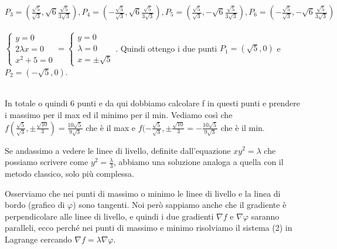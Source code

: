 \begin{itemize}
\begin{enumerate}
        $P_3 = (\frac{\sqrt{5}}{\sqrt{3}}, \sqrt{6}\frac{\sqrt{5}}{3\sqrt{3}}), P_4 = (-\frac{\sqrt{5}}{\sqrt{3}}, \sqrt{6}\frac{\sqrt{5}}{3\sqrt{3}}), P_5 = (\frac{\sqrt{5}}{\sqrt{3}}, -\sqrt{6}\frac{\sqrt{5}}{3\sqrt{3}}), P_6 = (-\frac{\sqrt{5}}{\sqrt{3}}, -\sqrt{6}\frac{\sqrt{5}}{3\sqrt{3}})$\\\\
        $\begin{cases}y = 0 \\ 2\lambda x = 0 \\ x^2 + 5 = 0\end{cases} = \begin{cases}y = 0 \\ \lambda = 0 \\ x = \pm \sqrt{5}\end{cases}$. Quindi ottengo i due punti $P_1 = (\sqrt{5},0)$ e $P_2 = (-\sqrt{5},0)$.\\\\
    \end{enumerate}
    In totale o quindi 6 punti e da qui dobbiamo calcolare f in questi punti e prendere i massimo per il max ed il minimo per il min. Vediamo così che $f(\frac{\sqrt{5}}{\sqrt{3}}, \pm \frac{\sqrt{10}}{3}) = \frac{10 \sqrt{5}}{9 \sqrt{3}}$ che è il max e $f(-\frac{\sqrt{5}}{\sqrt{3}}, \pm \frac{\sqrt{10}}{3} = -\frac{10\sqrt{5}}{9\sqrt{3}}$ che è il min.
\end{itemize}
Se andassimo a vedere le linee di livello, definite dall'equazione $xy^2 = \lambda$ che possiamo scrivere come $y^2 = \frac{\lambda}{3}$, abbiamo una soluzione analoga a quella con il metodo classico, solo più complessa.


\begin{observation}
Osserviamo che nei punti di massimo o minimo le linee di livello e la linea di bordo (grafico di $\varphi$) sono tangenti. Noi però sappiamo anche che il gradiente è perpendicolare alle linee di livello, e quindi i due gradienti $\nabla f$ e $\nabla \varphi$ saranno paralleli, ecco perché nei punti di massimo e minimo risolviamo il sistema (2) in Lagrange cercando $\nabla f = \lambda \nabla \varphi$.
\end{observation}

